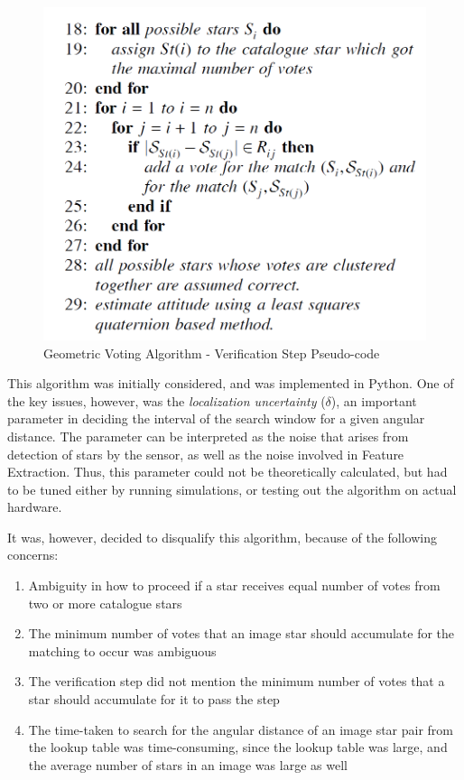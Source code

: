 \documentclass[../../main.tex]{subfiles}
\begin{document}
\begin{figure}
    \centering
    \includegraphics[scale=0.6]{Figures/GNC/GVM_Voting_Method.PNG}
    \caption{Geometric Voting Algorithm - Verification Step Pseudo-code}
    \label{fig:GVM_verification}
\end{figure}

This algorithm was initially considered, and was implemented in Python.
One of the key issues, however, was the \textit{localization uncertainty} ($\delta$), an important parameter in deciding the interval of the search window for a given angular distance. 
The parameter can be interpreted as the noise that arises from detection of stars by the sensor, as well as the noise involved in Feature Extraction. Thus, this parameter could not be theoretically calculated, but had to be tuned either by running simulations, or testing out the algorithm on actual hardware.

It was, however, decided to disqualify this algorithm, because of the following concerns:
\begin{enumerate}
    \item Ambiguity in how to proceed if a star receives equal number of votes from two or more catalogue stars
    
    \item The minimum number of votes that an image star should accumulate for the matching to occur was ambiguous
    
    \item The verification step did not mention the minimum number of votes that a star should accumulate for it to pass the step
    
    \item The time-taken to search for the angular distance of an image star pair from the lookup table was time-consuming, since the lookup table was large, and the average number of stars in an image was large as well 
\end{enumerate}
\end{document}
